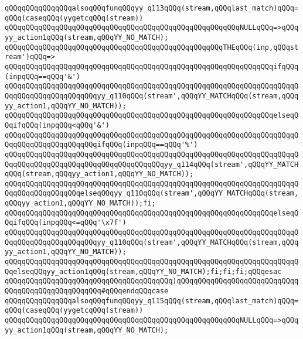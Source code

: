 \verb|qQQqqQQqqQQqqQQqalsoqQQqfunqQQqyy_q113qQQq(stream,qQQqlast_match)qQQq=qQQq(caseqQQq(yygetcqQQq(stream))|\newline
\verb|qQQqqQQqqQQqqQQqqQQqqQQqqQQqqQQqqQQqqQQqqQQqqQQqqQQqqQQqNULLqQQq=>qQQqyy_action1qQQq(stream,qQQqYY_NO_MATCH);|\newline
\verb|qQQqqQQqqQQqqQQqqQQqqQQqqQQqqQQqqQQqqQQqqQQqqQQqqQQqTHEqQQq(inp,qQQqstream')qQQq=>|\newline
\verb|qQQqqQQqqQQqqQQqqQQqqQQqqQQqqQQqqQQqqQQqqQQqqQQqqQQqqQQqqQQqqQQqifqQQq(inpqQQq==qQQq'&')|\newline
\verb|qQQqqQQqqQQqqQQqqQQqqQQqqQQqqQQqqQQqqQQqqQQqqQQqqQQqqQQqqQQqqQQqqQQqqQQqqQQqqQQqqQQqqQQqqQQqyy_q110qQQq(stream',qQQqYY_MATCHqQQq(stream,qQQqyy_action1,qQQqYY_NO_MATCH));|\newline
\verb|qQQqqQQqqQQqqQQqqQQqqQQqqQQqqQQqqQQqqQQqqQQqqQQqqQQqqQQqqQQqqQQqelseqQQqifqQQq(inpqQQq<qQQq'&')|\newline
\verb|qQQqqQQqqQQqqQQqqQQqqQQqqQQqqQQqqQQqqQQqqQQqqQQqqQQqqQQqqQQqqQQqqQQqqQQqqQQqqQQqqQQqqQQqqQQqifqQQq(inpqQQq==qQQq'%')|\newline
\verb|qQQqqQQqqQQqqQQqqQQqqQQqqQQqqQQqqQQqqQQqqQQqqQQqqQQqqQQqqQQqqQQqqQQqqQQqqQQqqQQqqQQqqQQqqQQqqQQqqQQqqQQqqQQqyy_q114qQQq(stream',qQQqYY_MATCHqQQq(stream,qQQqyy_action1,qQQqYY_NO_MATCH));|\newline
\verb|qQQqqQQqqQQqqQQqqQQqqQQqqQQqqQQqqQQqqQQqqQQqqQQqqQQqqQQqqQQqqQQqqQQqqQQqqQQqqQQqqQQqqQQqelseqQQqyy_q110qQQq(stream',qQQqYY_MATCHqQQq(stream,qQQqyy_action1,qQQqYY_NO_MATCH));fi;|\newline
\verb|qQQqqQQqqQQqqQQqqQQqqQQqqQQqqQQqqQQqqQQqqQQqqQQqqQQqqQQqqQQqqQQqelseqQQqifqQQq(inpqQQq<=qQQq'\x7f')|\newline
\verb|qQQqqQQqqQQqqQQqqQQqqQQqqQQqqQQqqQQqqQQqqQQqqQQqqQQqqQQqqQQqqQQqqQQqqQQqqQQqqQQqqQQqqQQqqQQqyy_q110qQQq(stream',qQQqYY_MATCHqQQq(stream,qQQqyy_action1,qQQqYY_NO_MATCH));|\newline
\verb|qQQqqQQqqQQqqQQqqQQqqQQqqQQqqQQqqQQqqQQqqQQqqQQqqQQqqQQqqQQqqQQqqQQqqQQqelseqQQqyy_action1qQQq(stream,qQQqYY_NO_MATCH);fi;fi;fi;qQQqesac|\newline
\verb|qQQqqQQqqQQqqQQqqQQqqQQqqQQqqQQqqQQqqQQq)qQQqqQQqqQQqqQQqqQQqqQQqqQQqqQQqqQQqqQQqqQQqqQQqqQQq#qQQqendqQQqcase|\newline
\verb|qQQqqQQqqQQqqQQqalsoqQQqfunqQQqyy_q115qQQq(stream,qQQqlast_match)qQQq=qQQq(caseqQQq(yygetcqQQq(stream))|\newline
\verb|qQQqqQQqqQQqqQQqqQQqqQQqqQQqqQQqqQQqqQQqqQQqqQQqqQQqqQQqNULLqQQq=>qQQqyy_action1qQQq(stream,qQQqYY_NO_MATCH);|\newline
